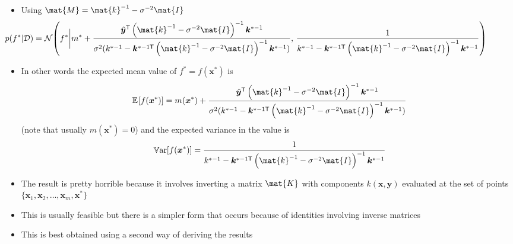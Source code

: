 \documentclass[11pt]{article}
\newcommand{\tr}{\textsf{T}}
\newcommand{\av}[2][]{\mathbb{E}_{#1\!}\left[ #2 \right]}
\begin{document}
\begin{itemize}
\begin{itemize}
\begin{itemize}
\begin{align*}
{\bm{k}^{*-1\tr}     \mat{M}^{-1} \bm{k}^{*-1}) (f^{*}-
m^* -   \frac{\hat{\bm{y}}^\tr \mat{M}^{-1}
\bm{k}^{*-1}}{\sigma^2(k^{*-1} - \bm{k}^{*-1\tr}
\mat{M}^{-1} \bm{k}^{*-1})})} \\
& \propto \mathcal{N}\!\left(f^*\bigg\vert m^* +  \frac{\hat{\bm{y}}^\tr \mat{M}^{-1}
\bm{k}^{*-1}}{\sigma^2(k^{*-1} - \bm{k}^{*-1\tr}
\mat{M}^{-1} \bm{k}^{*-1})}, k^{*-1} -
\bm{k}^{*-1\tr}     \mat{M}^{-1} \bm{k}^{*-1} \right)
\end{align*}
\begin{itemize}
\item where we use the fact that we end up with a term that has
the form of a normal distribution
\item because the posterior term is normalise, in fact it has to
be exactly equal to this normal distribution
\end{itemize}
\item Using \(\mat{M}=\mat{k}^{-1}-\sigma^{-2}\mat{I}\) 
$$ \hspace{-2cm} p(f^*|\mathcal{D}) =
	 \mathcal{N}\!\left(f^*\bigg\vert m^* +
         \frac{\hat{\bm{y}}^\tr
         \left(\mat{k}^{-1}-\sigma^{-2}\mat{I}\right)^{-1} 
         \bm{k}^{*-1}}{\sigma^2(k^{*-1} - \bm{k}^{*-1\tr}
         \left(\mat{k}^{-1}-\sigma^{-2}\mat{I}\right)^{-1}
         \bm{k}^{*-1})},\, \frac{1}{
        k^{*-1} - \bm{k}^{*-1\tr}
         \left(\mat{k}^{-1}-\sigma^{-2}\mat{I}\right)^{-1}
         \bm{k}^{*-1} } \right) $$
\item In other words the expected mean value of \(f^*=f(\bm{x}^*)\)
is
$$ \av{f(\bm{x}^*)} = m(\bm{x}^*) +
         \frac{\hat{\bm{y}}^\tr
         \left(\mat{k}^{-1}-\sigma^{-2}\mat{I}\right)^{-1} 
         \bm{k}^{*-1}}{\sigma^2(k^{*-1} - \bm{k}^{*-1\tr}
         \left(\mat{k}^{-1}-\sigma^{-2}\mat{I}\right)^{-1}
         \bm{k}^{*-1})} $$
(note that usually \(m(\bm{x}^*)=0\))
and the expected variance in the value is
$$ \mathbb{V}\mathrm{ar}[f(\bm{x}^*)] 
         = \frac{1}{k^{*-1} - \bm{k}^{*-1\tr}
         \left(\mat{k}^{-1}-\sigma^{-2}\mat{I}\right)^{-1}
         \bm{k}^{*-1}} $$
\item The result is pretty horrible because it involves inverting
a matrix \(\mat{K}\) with components \(k(\bm{x},\bm{y})\)
evaluated at the set of points
\(\{\bm{x}_1,\bm{x}_2,\ldots,\bm{x}_m,\bm{x}^*\}\)
\item This is usually feasible but there is a simpler form
that occurs because of identities involving inverse matrices
\item This is best obtained using a second way of deriving the results

\end{itemize}
\end{itemize}
\end{itemize}
\end{document}
